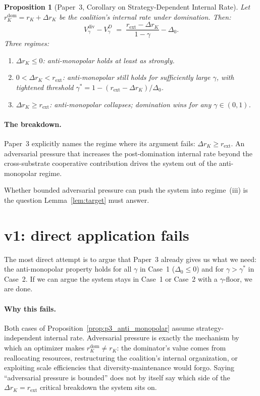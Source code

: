 \documentclass{article}
\newtheorem{proposition}{Proposition}
\newcommand{\rext}{r_{\mathrm{ext}}}
\newcommand{\Vdisc}{V_{\gamma}}
\begin{document}
\begin{proposition}[Paper~3, Corollary on Strategy-Dependent Internal
Rate]
\label{prop:p3_corollary}
Let $r_K^{\mathrm{dom}} = r_K + \Delta r_K$ be the coalition's internal
rate under domination.  Then:
\begin{equation}
\label{eq:p3_corollary}
\Vdisc^{\mathrm{div}} - \Vdisc^{D} \;=\; \frac{\rext - \Delta r_K}{1 -
\gamma} - \Delta_0.
\end{equation}
Three regimes:
\begin{enumerate}
\item[(i)] $\Delta r_K \leq 0$: anti-monopolar holds at least as
  strongly.
\item[(ii)] $0 < \Delta r_K < \rext$: anti-monopolar still holds for
  sufficiently large $\gamma$, with tightened threshold $\gamma^* = 1 -
  (\rext - \Delta r_K)/\Delta_0$.
\item[(iii)] $\Delta r_K \geq \rext$: anti-monopolar collapses;
  domination wins for any $\gamma \in (0, 1)$.
\end{enumerate}
\end{proposition}

\paragraph{The breakdown.}
Paper~3 explicitly names the regime where its argument fails:
$\Delta r_K \geq \rext$.  An adversarial pressure that increases the
post-domination internal rate beyond the cross-substrate cooperative
contribution drives the system out of the anti-monopolar regime.

Whether bounded adversarial pressure can push the system into
regime~(iii) is the question Lemma~\ref{lem:target} must answer.

\section{v1: direct application fails}

The most direct attempt is to argue that Paper~3 already gives us what
we need: the anti-monopolar property holds for all $\gamma$ in Case~1
($\Delta_0 \leq 0$) and for $\gamma > \gamma^*$ in Case~2.  If we can
argue the system stays in Case~1 or Case~2 with a $\gamma$-floor, we
are done.

\paragraph{Why this fails.}
Both cases of Proposition~\ref{prop:p3_anti_monopolar} assume
strategy-independent internal rate.  Adversarial pressure is exactly
the mechanism by which an optimizer makes $r_K^{\mathrm{dom}} \neq r_K$:
the dominator's value comes from reallocating resources, restructuring
the coalition's internal organization, or exploiting scale efficiencies
that diversity-maintenance would forgo.  Saying ``adversarial pressure
is bounded'' does not by itself say which side of the
$\Delta r_K = \rext$ critical breakdown the system sits on.
\end{document}
